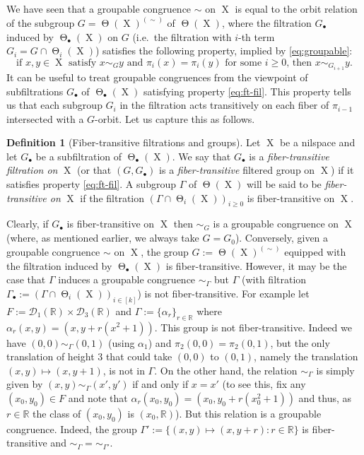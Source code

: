 \documentclass[a4paper,12pt,reqno]{amsart}
\theoremstyle{definition}
\newtheorem{defn}[theorem]{Definition}
\newcommand{\mc}{\mathcal}
\newcommand{\mb}{\mathbb}
\DeclareMathOperator{\tran}{\Theta}
\DeclareMathOperator{\ns}{X}
\begin{document}
We have seen that a groupable congruence $\sim$ on $\ns$ is equal to the orbit relation of the subgroup $G=\tran(\ns)^{(\sim)}$ of $\tran(\ns)$, where the filtration $G_\bullet$ induced by $\tran_\bullet(\ns)$ on $G$ (i.e.\ the filtration with $i$-th term $G_i=G\cap \tran_i(\ns)$) satisfies the following property, implied by \eqref{eq:groupable}:  
\begin{equation}\label{eq:ft-fil}
\textrm{if $x,y\in \ns$ satisfy $x \sim_G y$ and $\pi_i(x)=\pi_i(y)$ for some $i\geq 0$,  then $x\sim_{G_{i+1}} y$.}
\end{equation}
It can be useful to treat groupable congruences from the viewpoint of subfiltrations   $G_\bullet$ of $\tran_\bullet(\ns)$ satisfying property \eqref{eq:ft-fil}. This property tells us that each subgroup $G_i$ in the filtration acts transitively on each fiber of $\pi_{i-1}$ intersected with a $G$-orbit. Let us capture this as follows. 
\begin{defn}[Fiber-transitive filtrations and groups]\label{def:ft-fil}
Let $\ns$ be a nilspace and let $G_\bullet$ be a subfiltration of $\tran_\bullet(\ns)$. We say that $G_\bullet$ is a \emph{fiber-transitive filtration on} $\ns$ (or that $(G,G_\bullet)$ is a \emph{fiber-transitive} filtered group on $\ns$) 
if it satisfies property \eqref{eq:ft-fil}. A subgroup $\Gamma$ of $\tran(\ns)$ will be said to be \emph{fiber-transitive on} $\ns$ if the filtration $(\Gamma\cap \tran_i(\ns))_{i\geq 0}$ is fiber-transitive on $\ns$.
\end{defn}
\noindent Clearly, if $G_\bullet$ is fiber-transitive on $\ns$ then $\sim_G$ is a groupable congruence on $\ns$ (where, as mentioned earlier, we always take $G=G_0$). Conversely, given a groupable congruence $\sim$ on $\ns$, the group $G:=\tran(\ns)^{(\sim)}$ equipped with the filtration induced by $\tran_\bullet(\ns)$ is fiber-transitive. However, it may be the case that $\Gamma$ induces a groupable congruence $\sim_\Gamma$ but $\Gamma$ (with filtration $\Gamma_\bullet:=(\Gamma\cap \tran_i(\ns))_{i\in[k]}$) is not fiber-transitive. For example let $F:=\mc{D}_1(\mb{R})\times \mc{D}_3(\mb{R})$ and $\Gamma:=\{ \alpha_r \}_{r\in \mb{R}}$ where $\alpha_r(x,y)=(x,y+r(x^2+1))$. This group is not fiber-transitive. Indeed we have $(0,0)\sim_\Gamma (0,1)$ (using $\alpha_1$) and $\pi_2(0,0)=\pi_2(0,1)$, but the only translation of height 3 that could take $(0,0)$ to $(0,1)$, namely the translation $(x,y)\mapsto (x,y+1)$, is not in $\Gamma$. On the other hand, the relation $\sim_\Gamma$ is simply given by $(x,y)\sim_\Gamma (x',y')$ if and only if $x=x'$ (to see this, fix any $(x_0,y_0)\in F$ and note that $\alpha_r(x_0,y_0)=(x_0,y_0+r(x_0^2+1))$ and thus, as $r\in \mb{R}$ the class of $(x_0,y_0)$ is $(x_0,\mb{R})$). But this relation is a groupable congruence. Indeed, the group $\Gamma':=\{(x,y)\mapsto (x,y+r):r\in \mb{R}\}$ is fiber-transitive and $\sim_\Gamma = \sim_{\Gamma'}$.
\end{document}
